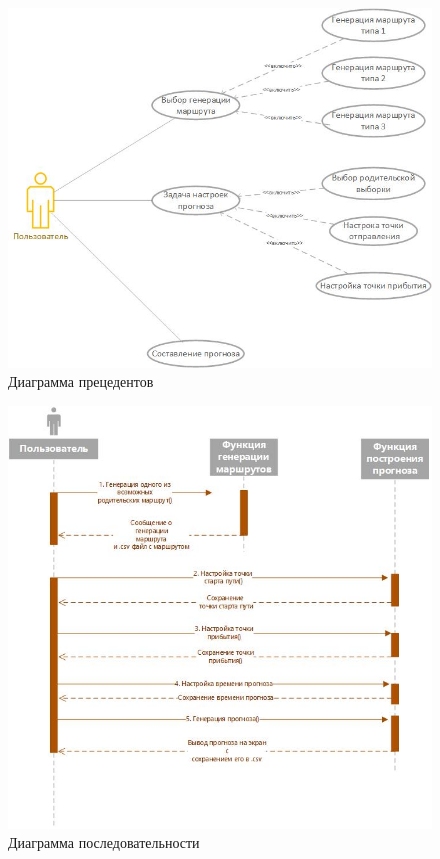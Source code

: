 \documentclass[a4paper,english]{G2-105}
\begin{document}
	\begin{figure}
		\includegraphics[width  = \linewidth]{gradulation_use-case.jpg}
		\caption{Диаграмма прецедентов}\label{use-case}
	\end{figure}

	\begin{figure}
		\includegraphics[width  = \linewidth]{gradulation_sequence_pic.jpg}
		\caption{Диаграмма последовательности}\label{sequence}
	\end{figure}
	
\end{document}
